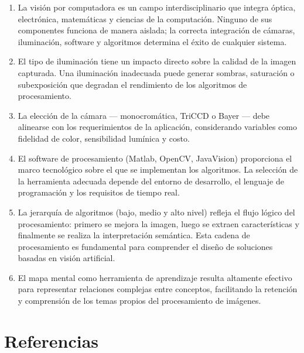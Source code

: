 \documentclass[12pt,letterpaper]{article}
\begin{document}
\begin{enumerate}[leftmargin=1.5cm]
    \item La visión por computadora es un campo interdisciplinario que integra óptica,
    electrónica, matemáticas y ciencias de la computación. Ninguno de sus componentes
    funciona de manera aislada; la correcta integración de cámaras, iluminación,
    software y algoritmos determina el éxito de cualquier sistema.

    \item El tipo de iluminación tiene un impacto directo sobre la calidad de la imagen
    capturada. Una iluminación inadecuada puede generar sombras, saturación o
    subexposición que degradan el rendimiento de los algoritmos de procesamiento.

    \item La elección de la cámara --- monocromática, TriCCD o Bayer --- debe alinearse
    con los requerimientos de la aplicación, considerando variables como fidelidad de
    color, sensibilidad lumínica y costo.

    \item El software de procesamiento (Matlab, OpenCV, JavaVision) proporciona el
    marco tecnológico sobre el que se implementan los algoritmos. La selección de la
    herramienta adecuada depende del entorno de desarrollo, el lenguaje de programación
    y los requisitos de tiempo real.

    \item La jerarquía de algoritmos (bajo, medio y alto nivel) refleja el flujo lógico
    del procesamiento: primero se mejora la imagen, luego se extraen características
    y finalmente se realiza la interpretación semántica. Esta cadena de procesamiento
    es fundamental para comprender el diseño de soluciones basadas en visión artificial.

    \item El mapa mental como herramienta de aprendizaje resulta altamente efectivo
    para representar relaciones complejas entre conceptos, facilitando la retención
    y comprensión de los temas propios del procesamiento de imágenes.
\end{enumerate}

\newpage
\section*{Referencias}
\end{document}
